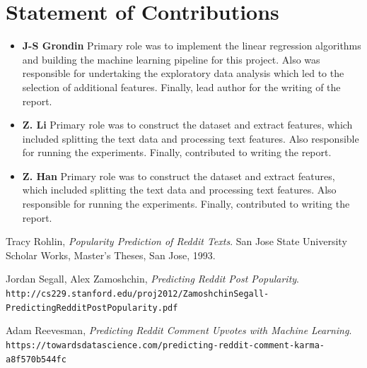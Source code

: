 \documentclass[11pt]{article}
\begin{document}
\section{Statement of Contributions}
\begin{itemize}
    	\item \textbf{J-S Grondin} Primary role was to implement the linear regression algorithms and building the machine learning pipeline for this project. Also was responsible for undertaking the exploratory data analysis which led to the selection of additional features. Finally, lead author for the writing of the report. 
   	\item \textbf{Z. Li} Primary role was to construct the dataset and extract features, which included splitting the text data and processing text features. Also responsible for running the experiments. Finally, contributed to writing the report. 
    	\item \textbf{Z. Han} Primary role was to construct the dataset and extract features, which included splitting the text data and processing text features. Also responsible for running the experiments. Finally, contributed to writing the report.
\end{itemize}

\begin{thebibliography}{9}
Tracy Rohlin,
\textit{Popularity Prediction of Reddit Texts}. 
San Jose State University Scholar Works, Master's Theses, San Jose, 1993.
 
Jordan Segall, Alex Zamoshchin,
\textit{Predicting Reddit Post Popularity}. 
\tiny\\\texttt{http://cs229.stanford.edu/proj2012/ZamoshchinSegall-PredictingRedditPostPopularity.pdf}
 \normalsize

Adam Reevesman,
\textit{Predicting Reddit Comment Upvotes with Machine Learning}.
\tiny\\\texttt{https://towardsdatascience.com/predicting-reddit-comment-karma-a8f570b544fc}
\end{thebibliography}
\end{document}
